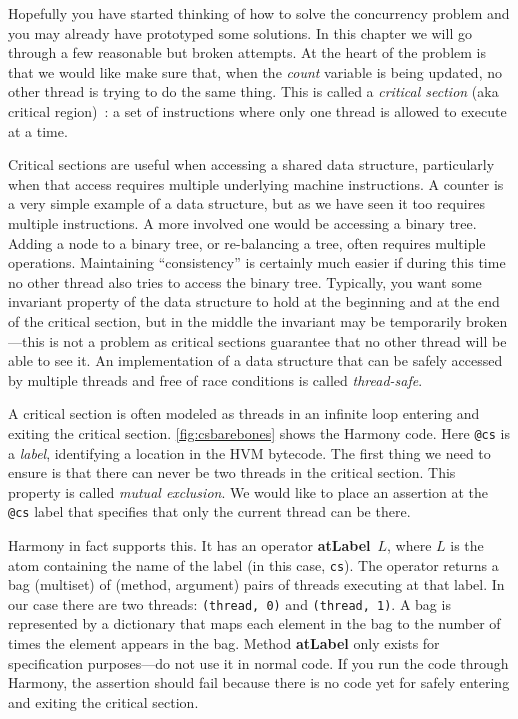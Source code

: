 \documentclass{report}
\begin{document}
Hopefully you have started thinking of how to solve the concurrency
problem and you may already have prototyped some solutions.
In this chapter we will go through a few reasonable but broken attempts.
At the heart of the problem is that we would like make sure that, when
the \textit{count} variable is being updated, no other thread is
trying to do the same thing.  This is called a \emph{critical section}
(aka critical region)~\cite{EWD123}:
a set of instructions where only one thread is allowed to execute at a
time.
%
%

%
%

Critical sections are useful when accessing a shared data
structure, particularly when that access requires multiple underlying
machine instructions.  A counter is a very simple example of
a data structure, but as we have seen it too requires multiple instructions.
A more involved one would be accessing a binary tree.
Adding a node to a binary tree, or re-balancing a tree, often requires
multiple operations.  Maintaining ``consistency'' is certainly much easier
if during this time no other
thread also tries to access the binary tree.
Typically, you want some invariant property of the data structure to hold
at the beginning and at the end of the critical section, but in the middle
the invariant may be temporarily broken---this is not a problem as critical
sections guarantee that no other
thread will be able to see it.
An implementation of a data structure that can be safely accessed by multiple
threads and free of race conditions is called \emph{thread-safe}.
%
%

%

A critical section is often modeled as threads in an infinite loop
entering and exiting the critical section.
\autoref{fig:csbarebones} shows the Harmony code.
Here \texttt{@cs} is a \emph{label},
%
identifying a location in the HVM bytecode.  The first thing we need to
ensure is that there can never be two threads in the critical section.
This property is called \emph{mutual exclusion}.
%
We would like to place an assertion at the \texttt{@cs} label that
specifies that only the current thread can be there.

Harmony in fact supports this.
It has an operator \textbf{atLabel}~$L$,
%
where $L$
is the atom containing the name of the label (in this case, \texttt{cs}).
The operator returns a bag (multiset) of (method, argument) pairs of threads
executing at that label.
In our case there are two threads: \texttt{(thread, 0)} and \texttt{(thread, 1)}.
A bag is represented by a dictionary that maps each element
in the bag to the number of times the element appears in the bag.
Method \textbf{atLabel} only exists for specification purposes---do not
use it in normal code.
If you run the code through Harmony, the assertion should fail because
there is no code yet for safely entering and exiting the critical section.
\end{document}
